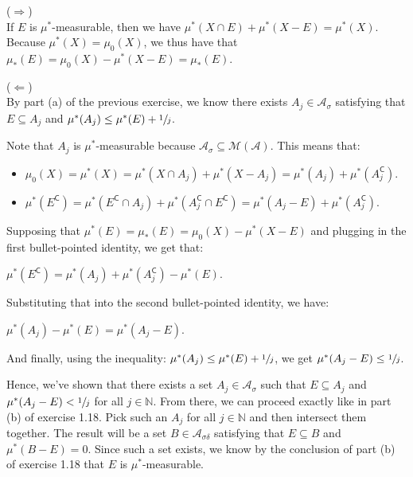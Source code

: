 \documentclass{book}
\newcommand{\exTwoP}{%
   \color{RedViolet}%
   \fontsize{13}{15}\selectfont%
}
\newenvironment{myIndent}{%
   \begin{adjustwidth}{2.5em}{0em}%
}{%
   \end{adjustwidth}%
}
\newcommand{\comp}{\mathsf{C}}
\newcommand{\retTwo}{\hfill\bigbreak}
\begin{document}
\begin{myIndent}\exTwoP
   ($\Longrightarrow$)\\
   If $E$ is $\mu^*$-measurable, then we have $\mu^*(X \cap E) + \mu^*(X - E) = \mu^*(X)$. Because $\mu^*(X) = \mu_0(X)$, we thus have that $\mu_*(E) = \mu_0(X) - \mu^*(X - E) = \mu_*(E)$.\retTwo

   ($\Longleftarrow$)\\
   By part (a) of the previous exercise, we know there exists $A_j \in \mathcal{A}_\sigma$ satisfying that\\ $E \subseteq A_j$ and $\mu^*(A_j) \leq \mu^*(E) + \sfrac{1}{j}$.\retTwo

   Note that $A_j$ is $\mu^*$-measurable because $\mathcal{A}_\sigma \subseteq \mathcal{M}(\mathcal{A})$. This means that:
   \begin{itemize}
      \item $\mu_0(X) = \mu^*(X) = \mu^*(X \cap A_j) + \mu^*(X - A_j) = \mu^*(A_j) + \mu^*(A_j^\comp)$.
      \item $\mu^*(E^\comp) = \mu^*(E^\comp \cap A_j) + \mu^*(A^\comp_j \cap E^\comp) = \mu^*(A_j - E) + \mu^*(A^\comp_j)$.\retTwo
   \end{itemize}

   Supposing that $\mu^*(E) = \mu_*(E) = \mu_0(X) - \mu^*(X - E)$ and plugging in the first bullet-pointed identity, we get that:
   
   {\centering $\mu^*(E^\comp) = \mu^*(A_j) + \mu^*(A_j^\comp) - \mu^*(E)$.\retTwo\par}

   Substituting that into the second bullet-pointed identity, we have:

   {\centering $\mu^*(A_j) - \mu^*(E) = \mu^*(A_j - E)$.\newpage\par}

   And finally, using the inequality: $\mu^*(A_j) \leq \mu^*(E) + \sfrac{1}{j}$, we get $\mu^*(A_j - E) \leq \sfrac{1}{j}$.\retTwo

   Hence, we've shown that there exists a set $A_j \in \mathcal{A}_\sigma$ such that $E \subseteq A_j$ and\\ $\mu^*(A_j - E) < \sfrac{1}{j}$ for all $j \in \mathbb{N}$. From there, we can proceed exactly like in part\\ (b) of exercise 1.18. Pick such an $A_j$ for all $j \in \mathbb{N}$ and then intersect them together. The result will be a set $B \in \mathcal{A}_{\sigma\delta}$ satisfying that $E \subseteq B$ and $\mu^*(B - E) = 0$. Since such a set exists, we know by the conclusion of part (b) of exercise 1.18 that $E$ is $\mu^*$-measurable.
\end{myIndent}
\end{document}
